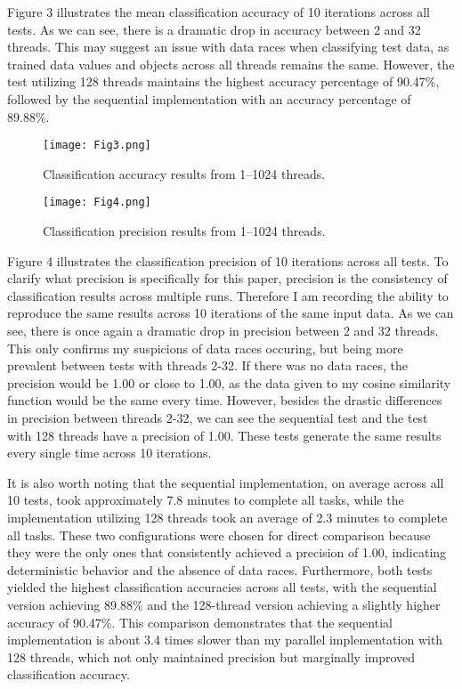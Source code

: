 \documentclass[conference]{IEEEtran}
\begin{document}
Figure 3 illustrates the mean classification accuracy of 10 iterations across all tests. As we can see, there is a dramatic drop in accuracy between 2 and 32 threads. This may suggest an issue with data races when classifying test data, as trained data values and objects across all threads remains the same. However, the test utilizing 128 threads maintains the highest accuracy percentage of 90.47\%, followed by the sequential implementation with an accuracy percentage of 89.88\%. 

\begin{figure}[htbp]
\centerline{\texttt{[image: Fig3.png]}}
\caption{Classification accuracy results from 1--1024 threads.}
\label{fig}
\end{figure}

\begin{figure}[htbp]
\centerline{\texttt{[image: Fig4.png]}}
\caption{Classification precision results from 1--1024 threads.}
\label{fig}
\end{figure}

Figure 4 illustrates the classification precision of 10 iterations across all tests. To clarify what precision is specifically for this paper, precision is the consistency of classification results across multiple runs. Therefore I am recording the ability to reproduce the same results across 10 iterations of the same input data. As we can see, there is once again a dramatic drop in precision between 2 and 32 threads. This only confirms my suspicions of data races occuring, but being more prevalent between tests with threads 2-32. If there was no data races, the precision would be 1.00 or close to 1.00, as the data given to my cosine similarity function would be the same every time. However, besides the drastic differences in precision between threads 2-32, we can see the sequential test and the test with 128 threads have a precision of 1.00. These tests generate the same results every single time across 10 iterations.

It is also worth noting that the sequential implementation, on average across all 10 tests, took approximately 7.8 minutes to complete all tasks, while the implementation utilizing 128 threads took an average of 2.3 minutes to complete all tasks. These two configurations were chosen for direct comparison because they were the only ones that consistently achieved a precision of 1.00, indicating deterministic behavior and the absence of data races. Furthermore, both tests yielded the highest classification accuracies across all tests, with the sequential version achieving 89.88\% and the 128-thread version achieving a slightly higher accuracy of 90.47\%. This comparison demonstrates that the sequential implementation is about 3.4 times slower than my parallel implementation with 128 threads, which not only maintained precision but marginally improved classification accuracy.
\end{document}
